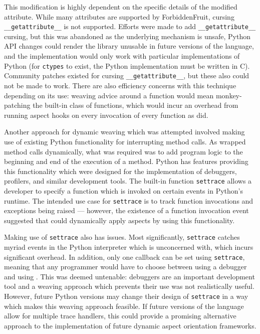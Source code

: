 This modification is highly dependent on the specific details of the modified
attribute. While many attributes are supported by ForbiddenFruit, cursing
\lstinline{__getattribute__} is not supported. Efforts were made to add
\lstinline{__getattribute__} cursing, but this was abandoned as the underlying
mechanism is unsafe, Python API changes could render the library unusable in
future versions of the language, and the implementation would only work with
particular implementations of Python (for \lstinline{ctypes} to exist, the
Python implementation must be written in C). Community patches existed for
cursing \lstinline{__getattribute__}, but these also could not be made to work.
There are also efficiency concerns with this technique depending on its use:
weaving advice around a function would mean monkey-patching the built-in class
of functions, which would incur an overhead from running aspect hooks on every
invocation of every function as \pydysofu{} did.

Another approach for dynamic weaving which was attempted involved making use of
existing Python functionality for interrupting method calls. As \pydysofu{}
wrapped method calls dynamically, what was required was to add program logic to
the beginning and end of the execution of a method. Python has features
providing this functionality which were designed for the implementation of
debuggers, profilers, and similar development tools. The built-in function
\lstinline{settrace} allows a developer to specify a function which is invoked
on certain events in Python's runtime. The intended use case for
\lstinline{settrace} is to track function invocations and exceptions being
raised --- however, the existence of a function invocation event suggested that
\pdsfthree{} could dynamically apply aspects by using this functionality.

Making use of \lstinline{settrace} also has issues. Most significantly,
\lstinline{settrace} catches myriad events in the Python interpreter which
\pdsfthree{} is unconcerned with, which incurs significant overhead. In
addition, only one callback can be set using \lstinline{settrace}, meaning that
any programmer would have to choose between using a debugger and using
\pdsfthree{}. This was deemed untenable: debuggers are an important development
tool and a weaving approach which prevents their use was not realistically
useful. However, future Python versions may change their design of
\lstinline{settrace} in a way which makes this weaving approach feasible. If
future versions of the language allow for multiple trace handlers, this could
provide a promising alternative approach to the implementation of future dynamic
aspect orientation frameworks.


